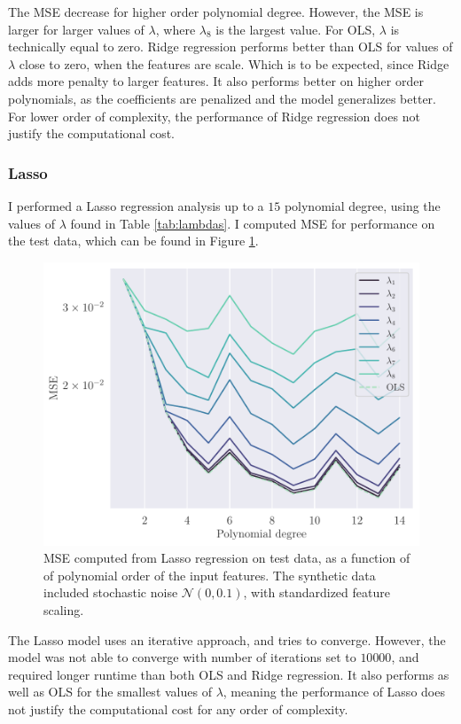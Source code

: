 The MSE decrease for higher order polynomial degree. However, the MSE is larger for larger values of $\lambda$, where $\lambda_{8}$ is the largest value. For OLS, $\lambda$ is technically equal to zero. Ridge regression performs better than OLS for values of $\lambda$ close to zero, when the features are scale. Which is to be expected, since Ridge adds more penalty to larger features. It also performs better on higher order polynomials, as the coefficients are penalized and the model generalizes better. For lower order of complexity, the performance of Ridge regression does not justify the computational cost. 

\subsubsection{Lasso}\label{sssec:lasso_synthetic}
I performed a Lasso regression analysis up to a $15$ polynomial degree, using the values of $\lambda$ found in Table \ref{tab:lambdas}. I computed MSE for performance on the test data, which can be found in Figure \ref{fig:lasso_error}.
\begin{figure}[h]
    \centering
    \includegraphics[width=\linewidth]{project-1/latex/figures/lasso_error_scaled_N50.pdf}
    \caption{MSE computed from Lasso regression on test data, as a function of of polynomial order of the input features. The synthetic data included stochastic noise $\mathcal{N}(0, 0.1)$, with standardized feature scaling.}
    \label{fig:lasso_error}
\end{figure}
The Lasso model uses an iterative approach, and tries to converge. However, the model was not able to converge with number of iterations set to $10 000$, and required longer runtime than both OLS and Ridge regression. It also performs as well as OLS for the smallest values of $\lambda$, meaning the performance of Lasso does not justify the computational cost for any order of complexity.

